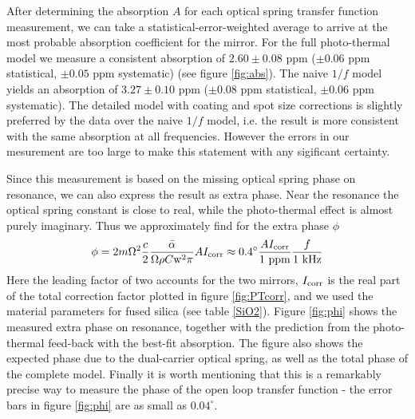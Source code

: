After determining the absorption $A$ for each optical spring transfer function measurement, we can take a statistical-error-weighted average to arrive at the most probable absorption coefficient for the mirror.  For the full photo-thermal model we measure a consistent absorption of  $2.60\pm0.08$ ppm ($\pm 0.06$ ppm statistical,  $\pm 0.05$ ppm systematic) (see figure \ref{fig:abs}). The naive $1/f$ model yields an absorption of $3.27\pm0.10$ ppm ($\pm 0.08$ ppm statistical,  $\pm 0.06$ ppm systematic).  The detailed model with coating and spot size corrections is slightly preferred by the data over the naive $1/f$ model, i.e. the result is more consistent with the same absorption at all frequencies. However the errors in our mesurement are too large to make this statement with any sigificant certainty.



Since this measurement is based on the missing optical spring phase on resonance, we can also express the result as extra phase. Near the resonance the optical spring constant is close to real, while the photo-thermal effect is almost purely imaginary. Thus we approximately find for the extra phase $\phi$
\begin{equation}
\phi =  2 m \Omega^2 \frac{c}{2} \frac{\bar{\alpha}}{\Omega \rho C {\rm w}^2 \pi} A I_{\rm corr}
\approx 0.4^{\circ} \frac{A I_{\rm corr}}{1~{\rm ppm}} \frac{f}{1~{\rm kHz}} 
\label{eq:phase}
\end{equation}
Here the leading factor of two accounts for the two mirrors, $I_{\rm corr}$ is the real part of the total correction factor plotted in figure \ref{fig:PTcorr}, and we used the material parameters for fused silica (see table \ref{SiO2}).  
Figure \ref{fig:phi} shows the measured extra phase on resonance, together with the prediction from the photo-thermal feed-back with the best-fit absorption. The figure also shows the expected phase due to the dual-carrier optical spring, as well as the total phase of the complete model. Finally it is worth mentioning that this is a remarkably precise way to measure the phase of the open loop transfer function - the  error bars in figure \ref{fig:phi} are as small as $0.04^{\circ}$.






